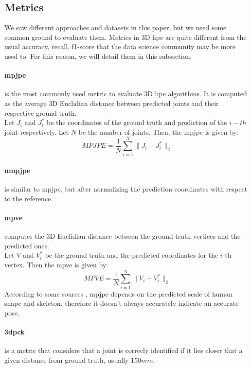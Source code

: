 \documentclass[runningheads]{llncs}
\begin{document}
\subsection{Metrics}
We saw different approaches and datasets in this paper, but we need some common ground to evaluate them. Metrics in 3D \ac{hpe} are quite different from the usual accuracy, recall, f1-score that the data science community may be more used to. For this reason, we will detail them in this subsection.
\paragraph{\ac{mpjpe}} is the most commonly used metric to evaluate 3D \ac{hpe} algorithms. It is computed as the average 3D Euclidian distance between predicted joints and their respective ground truth. \\
Let $J_i$ and $J_i^*$ be the coordinates of the ground truth and prediction of the $i-th$ joint respectively. Let $N$ be the number of joints. Then, the \ac{mpjpe} is given by:
\begin{equation}
  MPJPE = \frac{1}{N} \sum_{i=1}^N \|J_i - J_i^*\|_2
\end{equation}

\paragraph{\ac{nmpjpe}} is similar to \ac{mpjpe}, but after normalizing the prediction coordinates with respect to the reference.

\paragraph{\ac{mpve}} computes the 3D Euclidian distance between the ground truth vertices and the predicted ones. \\
Let $V$ and $V_i^*$ be the ground truth and the predicted coordinates for the $i$-th vertex. Then the \ac{mpve} is given by:
\begin{equation}
  MPVE = \frac{1}{N} \sum_{i=1}^N \|V_i - V_i^*\|_2
\end{equation}
According to some sources \cite{survey}, \ac{mpjpe} depends on the predicted scale of human shape and skeleton, therefore it doesn't always accurately indicate an accurate pose.

\paragraph{\ac{3dpck}} is a metric that considers that a joint is correcly identified if it lies closer that a given distance from ground truth, usually $150mm$.
\end{document}
